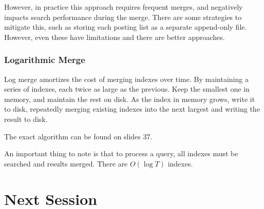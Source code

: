 \documentclass{idc_msc}
\begin{document}
However, in practice this approach requires frequent merges, and negatively impacts search performance during the merge.
There are some strategies to mitigate this, such as storing each posting list as a separate append-only file.
However, even these have limitations and there are better approaches.

\subsubsection{Logarithmic Merge}

Log merge amortizes the cost of merging indexes over time.
By maintaining a series of indexes, each twice as large as the previous.
Keep the smallest one in memory, and maintain the rest on disk.
As the index in memory grows, write it to disk, repeatedly merging existing indexes into the next largest and writing the result to disk.

The exact algorithm can be found on slides 37.

An important thing to note is that to process a query, all indexes must be searched and results merged.
There are \(O(\log T)\) indexes.

\section{Next Session}
\end{document}
